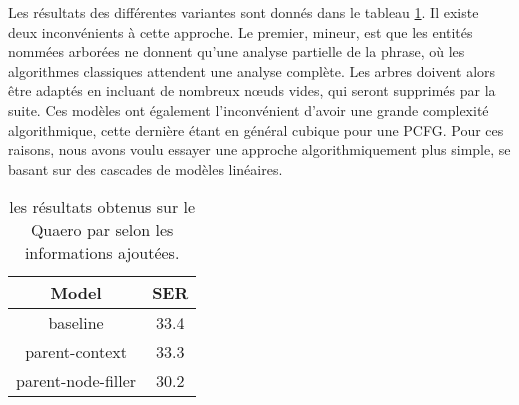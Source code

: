 \documentclass[PhD-Yoann-Dupont.tex]{subfiles}
\begin{document}
    Les résultats des différentes variantes sont donnés dans le tableau \ref{tab:md-quaero-results}. Il existe deux inconvénients à cette approche. Le premier, mineur, est que les entités nommées arborées ne donnent qu'une analyse partielle de la phrase, où les algorithmes classiques attendent une analyse complète. Les arbres doivent alors être adaptés en incluant de nombreux n\oe uds vides, qui seront supprimés par la suite. Ces modèles ont également l'inconvénient d'avoir une grande complexité algorithmique, cette dernière étant en général cubique pour une PCFG. Pour ces raisons, nous avons voulu essayer une approche algorithmiquement plus simple, se basant sur des cascades de modèles linéaires.
    
    \begin{table}
    \centering
    \begin{tabular}{|c|c|}
    \hline
    Model & SER \\
    \hline
    baseline & 33.4 \\
    parent-context & 33.3 \\
    parent-node-filler & 30.2 \\
    \hline
    \end{tabular}
    \caption{les résultats obtenus sur le Quaero par \citet{dinarelli2012} selon les informations ajoutées.}
    \label{tab:md-quaero-results}
    \end{table}
\end{document}

